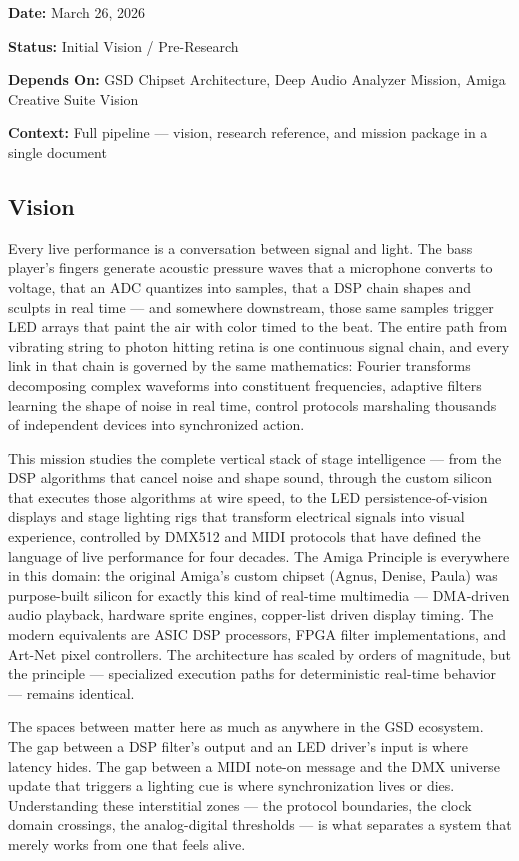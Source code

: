 \documentclass[11pt,letterpaper]{article}
\newcommand{\metafield}[2]{\textbf{\sffamily #1} #2\par}
\begin{document}
\metafield{Date:}{March 26, 2026}
\metafield{Status:}{Initial Vision / Pre-Research}
\metafield{Depends On:}{GSD Chipset Architecture, Deep Audio Analyzer Mission, Amiga Creative Suite Vision}
\metafield{Context:}{Full pipeline --- vision, research reference, and mission package in a single document}

\subsection{Vision}

Every live performance is a conversation between signal and light. The bass player's fingers generate acoustic pressure waves that a microphone converts to voltage, that an ADC quantizes into samples, that a DSP chain shapes and sculpts in real time --- and somewhere downstream, those same samples trigger LED arrays that paint the air with color timed to the beat. The entire path from vibrating string to photon hitting retina is one continuous signal chain, and every link in that chain is governed by the same mathematics: Fourier transforms decomposing complex waveforms into constituent frequencies, adaptive filters learning the shape of noise in real time, control protocols marshaling thousands of independent devices into synchronized action.

This mission studies the complete vertical stack of stage intelligence --- from the DSP algorithms that cancel noise and shape sound, through the custom silicon that executes those algorithms at wire speed, to the LED persistence-of-vision displays and stage lighting rigs that transform electrical signals into visual experience, controlled by DMX512 and MIDI protocols that have defined the language of live performance for four decades. The Amiga Principle is everywhere in this domain: the original Amiga's custom chipset (Agnus, Denise, Paula) was purpose-built silicon for exactly this kind of real-time multimedia --- DMA-driven audio playback, hardware sprite engines, copper-list driven display timing. The modern equivalents are ASIC DSP processors, FPGA filter implementations, and Art-Net pixel controllers. The architecture has scaled by orders of magnitude, but the principle --- specialized execution paths for deterministic real-time behavior --- remains identical.

The spaces between matter here as much as anywhere in the GSD ecosystem. The gap between a DSP filter's output and an LED driver's input is where latency hides. The gap between a MIDI note-on message and the DMX universe update that triggers a lighting cue is where synchronization lives or dies. Understanding these interstitial zones --- the protocol boundaries, the clock domain crossings, the analog-digital thresholds --- is what separates a system that merely works from one that feels alive.
\end{document}
